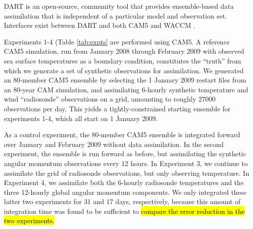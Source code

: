 DART \citep{Anderson2009} is an open-source, community tool that provides ensemble-based data assimilation that is independent of a particular model and observation set.
Interfaces exist between DART and both CAM5 \citep{Raeder2012} and WACCM \citep{Pedatella2013}.

Experiments 1-4 (Table \ref{tab:expts} are performed using CAM5.  
A reference CAM5 simulation, run from January 2008 through February 2009 with observed sea surface temperatures as a boundary condition, constitutes the ``truth'' from which we generate a set of synthetic observations for assimilation. 
We generated an 80-member CAM5 ensemble by selecting the 1 January 2009 restart files from an 80-year CAM simulation, and assimilating 6-hourly synthetic temperature and wind ``radiosonde'' observations on a grid, amounting to roughly 27000 observations per day. 
This yields a tightly-constrained starting ensemble for experiments 1-4, which all start on 1 January 2009.

As a control experiment, the 80-member CAM5 ensemble is integrated forward over January and February 2009 without data assimilation. 
In the second experiment, the ensemble is run forward as before, but assimilating the synthetic angular momentum observations every 12 hours.
In Experiment 3, we continue to assimilate the grid of radiosonde observations, but only observing temperature.
In Experiment 4, we assimilate both the 6-hourly radiosonde temperatures and the three 12-hourly global angular momentum components.
We only integrated these latter two experiments for 31 and 17 days, respectively, because this amount of integration time was found to be sufficient to \hl{compare the error reduction in the two experiments.} 


